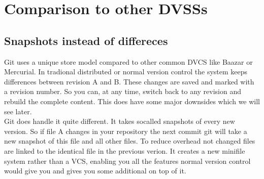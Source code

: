 \section {Comparison to other DVSSs}

\subsection{Snapshots instead of differeces}

Git uses a unique store model compared to other common DVCS like Baazar or Mercurial. In tradional distributed or normal version control the system keeps differences between revision A and B. These changes are saved and marked with a revision number. So you can, at any time, switch back to any revision and rebuild the complete content. This does have some major downsides which we will see later. \\
Git does handle it quite different. It takes socalled snapshots of every new version. So if file A changes in your repository the next commit git will take a new snapshot of this file and all other files. To reduce overhead not changed files are linked to the identical file in the previous verion. It creates a new minifile system rather than a VCS, enabling you all the features normal version control would give you and gives you some additional on top of it. \cite{gitpro2009} 